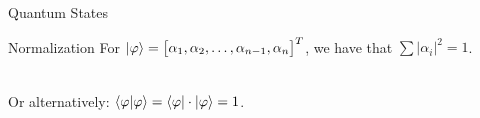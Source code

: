 \begin{frame}{Quantum States}
\pause

  	\begin{block}{Normalization}
		For $\ket{\varphi} =  \begin{bmatrix}\alpha_1, \alpha_2, \dots, \alpha_{n-1}, \alpha_n\end{bmatrix}^T$, we have that $\sum |\alpha_i|^2 = 1$.
		
		~\\
		Or alternatively: $\braket{\varphi|\varphi} = \bra{\varphi}\cdot \ket{\varphi} = 1$.
  	\end{block}




\end{frame}







